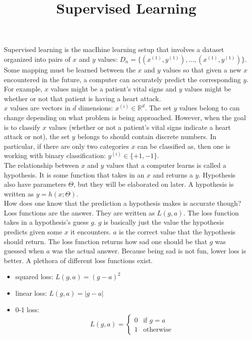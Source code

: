 \documentclass{article}
\title{Supervised Learning}
\author{ }
\date{ }
\begin{document}
\maketitle 

Supervised learning is the macIhine learning setup that involves a dataset organized into pairs of $x$ and $y$ values: $D_n = \{(x^{(1)}, y^(1)), ... , (x^(1), y^(1))\}$. Some mapping must be learned between the $x$ and $y$ values so that given a new $x$ encountered in the future, a computer can accurately predict the corresponding $y$. For example, $x$ values might be a patient's vital signs and $y$ values might be whether or not that patient is having a heart attack. \\

$x$ values are vectors in $d$ dimensions: $x^{(i)} \in \mathbb{R}^d$. The set $y$ values belong to can change depending on what problem is being approached. However, when the goal is to classify $x$ values (whether or not a patient's vital signs indicate a heart attack or not), the set $y$ belongs to should contain discrete numbers. In particular, if there are only two categories $x$ can be classified as, then one is working with binary classification: $y^{(i)} \in \{+1, -1\}$. \\ 

The relationship between $x$ and $y$ values that a computer learns is called a hypothesis. It is some function that takes in an $x$ and returns a $y$. Hypothesis also have parameters $\Theta$, but they will be elaborated on later. A hypothesis is written as $y = h(x; \Theta)$. \\

How does one know that the prediction a hypothesis makes is accurate though? Loss functions are the answer. They are written as $L(g,a)$. The loss function takes in a hypothesis's guess $g$. $g$ is basically just the value the hypothesis predicts given some $x$ it encounters. $a$ is the correct value that the hypothesis should return. The loss function returns how sad one should be that $g$ was guessed when $a$ was the actual answer. Because being sad is not fun, lower loss is better. A plethora of different loss functions exist. 
\begin{itemize}
	\item squared loss: $L(g,a) = (g-a)^2$
	\item linear loss: $L(g,a) = |g-a|$
	\item 0-1 loss: 
    \[
        L(g,a)=
        \begin{cases}
            0 & \text{if } g = a \\
            1 & \text{otherwise}
        \end{cases}
    \]
\end{itemize} 
\end{document}
